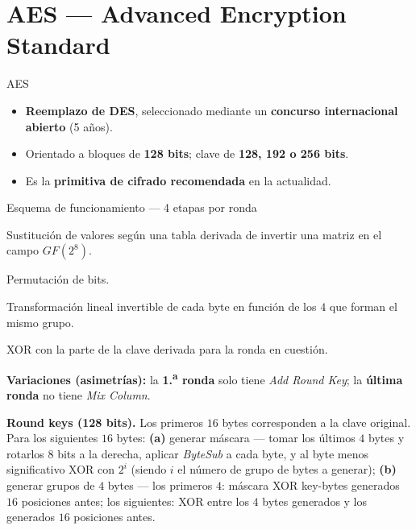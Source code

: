 \documentclass[11pt,a4paper]{article}
\begin{document}
\section{AES — Advanced Encryption Standard}

\begin{defbox}{AES}
\begin{itemize}[leftmargin=1.4em,itemsep=1pt]
  \item \textbf{Reemplazo de DES}, seleccionado mediante un \textbf{concurso internacional
        abierto} (5 años).
  \item Orientado a bloques de \textbf{128 bits}; clave de \textbf{128, 192 o 256 bits}.
  \item Es la \textbf{primitiva de cifrado recomendada} en la actualidad.
\end{itemize}
\end{defbox}

\begin{defbox}{Esquema de funcionamiento — 4 etapas por ronda}
\begin{description}[leftmargin=0pt,style=nextline,itemsep=2pt]
  \item[Byte Sub.] Sustitución de valores según una tabla derivada de invertir una matriz
        en el campo $GF(2^8)$.
  \item[Shift Row.] Permutación de bits.
  \item[Mix Column.] Transformación lineal invertible de cada byte en función de los $4$
        que forman el mismo grupo.
  \item[Add Round Key.] XOR con la parte de la clave derivada para la ronda en cuestión.
\end{description}
\textbf{Variaciones (asimetrías):} la \textbf{1.\textsuperscript{a} ronda} solo tiene
\emph{Add Round Key}; la \textbf{última ronda} no tiene \emph{Mix Column}.
\end{defbox}

\begin{slidebox}
\textbf{Round keys (128 bits).} Los primeros $16$ bytes corresponden a la clave original.
Para los siguientes $16$ bytes: \textbf{(a)} generar máscara — tomar los últimos $4$
bytes y rotarlos $8$ bits a la derecha, aplicar \emph{ByteSub} a cada byte, y al byte
menos significativo XOR con $2^i$ (siendo $i$ el número de grupo de bytes a generar);
\textbf{(b)} generar grupos de $4$ bytes — los primeros $4$: máscara XOR key-bytes
generados $16$ posiciones antes; los siguientes: XOR entre los $4$ bytes generados y los
generados $16$ posiciones antes.
\end{slidebox}
\end{document}
